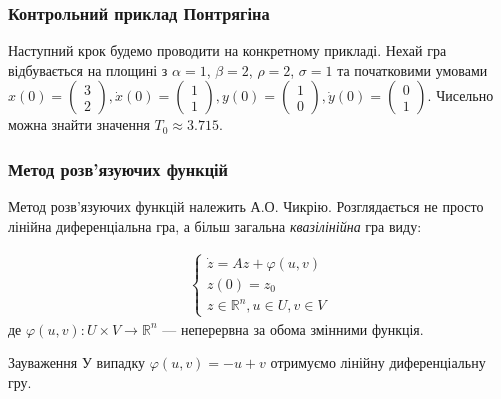 \documentclass[10pt,pdf,aspectratio=169]{beamer}
\newcommand{\R}{\mathbb{R}}
\newcommand{\vf}{\varphi}
\renewcommand{\d}[1]{\dot{#1}}
\begin{document}
    \begin{frame}
        \frametitle{Контрольний приклад Понтрягіна}
    
        Наступний крок будемо проводити на конкретному прикладі. Нехай гра відбувається на площині з 
        $\alpha=1$, $\beta=2$, $\rho=2$, $\sigma=1$ та
        початковими умовами $x(0) = \begin{pmatrix}
            3 \\ 2
        \end{pmatrix}, \d{x}(0) = \begin{pmatrix}
            1 \\ 1
        \end{pmatrix}, y(0) = \begin{pmatrix}
            1 \\ 0
        \end{pmatrix}, \d{y}(0) = \begin{pmatrix}
            0 \\ 1
        \end{pmatrix}$. Чисельно можна знайти значення $T_0 \approx 3.715$.
        \begin{center}
            \resizebox{160pt}{!}{
                
            }
        \end{center}
    \end{frame}
    \begin{frame}
        \frametitle{Метод розв’язуючих функцій}
    
        Метод розв’язуючих функцій належить А.О. Чикрію.
        Розглядається не просто лінійна диференціальна гра, а більш загальна
        \emph{квазілінійна} гра виду:
    
        \begin{gather*}
            \begin{cases}
                \d{z} = A z + \vf(u, v) \\
                z(0) = z_0 \\
                z \in \R^n, u \in U, v \in V
            \end{cases}
        \end{gather*}
        де $\vf(u, v) : U\times V \to \R^n$ --- неперервна за обома змінними функція.
        
        \begin{block}{Зауваження}
            У випадку $\vf(u,v) = -u + v$ отримуємо лінійну диференціальну гру.
        \end{block}
    \end{frame}
\end{document}
